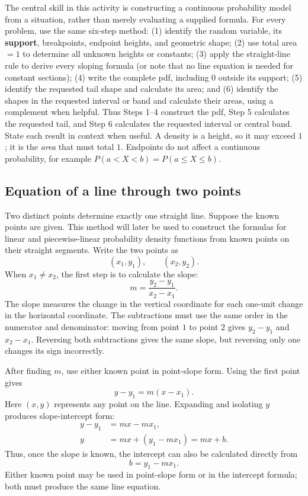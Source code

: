 The central skill in this activity is constructing a continuous probability
model from a situation, rather than merely evaluating a supplied formula.  For
every problem, use the same six-step method: (1) identify the random variable,
its \textbf{support}, breakpoints, endpoint heights, and geometric shape;
(2) use total area $=1$ to determine all unknown heights or constants;
(3) apply the straight-line rule to derive every sloping formula (or note that
no line equation is needed for constant sections); (4) write the complete pdf,
including $0$ outside its support; (5) identify the requested tail shape and
calculate its area; and (6) identify the shapes in the requested interval or
band and calculate their areas, using a complement when helpful.  Thus Steps
1--4 construct the pdf, Step 5 calculates the requested tail, and Step 6
calculates the requested interval or central band.  State each result in
context when useful.  A density is a height, so it may exceed
$1$; it is the \emph{area} that must total $1$.  Endpoints do not affect a
continuous probability, for example $P(a<X<b)=P(a\le X\le b)$.

\subsection{Equation of a line through two points}\label{sec:c2-intro-line-equation}
Two distinct points determine exactly one straight line.  Suppose the known
points are given.  This method will later be used to construct the formulas for
linear and piecewise-linear probability density functions from known points on
their straight segments.  Write the two points as
\[
 (x_1,y_1),\qquad (x_2,y_2).
\]
When $x_1\ne x_2$, the first step is to calculate the slope:
\[
 m=\frac{y_2-y_1}{x_2-x_1}.
\]
The slope measures the change in the vertical coordinate for each one-unit
change in the horizontal coordinate.  The subtractions must use the same order
in the numerator and denominator: moving from point $1$ to point $2$ gives
$y_2-y_1$ and $x_2-x_1$.  Reversing both subtractions gives the same slope,
but reversing only one changes its sign incorrectly.

After finding $m$, use either known point in point-slope form.  Using the first
point gives
\[
 y-y_1=m(x-x_1).
\]
Here $(x,y)$ represents any point on the line.  Expanding and isolating $y$
produces slope-intercept form:
\[
 \begin{aligned}
 y-y_1&=mx-mx_1,\\
 y&=mx+(y_1-mx_1)=mx+b.
 \end{aligned}
\]
Thus, once the slope is known, the intercept can also be calculated directly
from
\[
 b=y_1-mx_1.
\]
Either known point may be used in point-slope form or in the intercept formula;
both must produce the same line equation.

